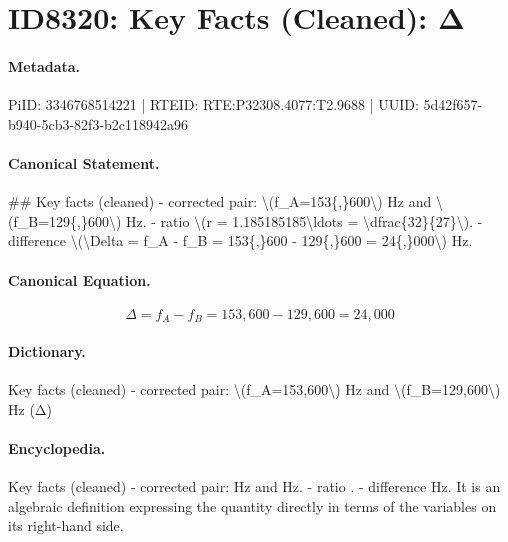 \section*{ID8320: Key Facts (Cleaned): Δ}
\paragraph{Metadata.}
PiID: 3346768514221 | RTEID: RTE:P32308.4077:T2.9688 | UUID: 5d42f657-b940-5cb3-82f3-b2c118942a96

\paragraph{Canonical Statement.}
\#\# Key facts (cleaned) - corrected pair: \textbackslash{}(f\_A=153\{,\}600\textbackslash{}) Hz and \textbackslash{}(f\_B=129\{,\}600\textbackslash{}) Hz. - ratio \textbackslash{}(r = 1.185185185\textbackslash{}ldots = \textbackslash{}dfrac\{32\}\{27\}\textbackslash{}). - difference \textbackslash{}(\textbackslash{}Delta = f\_A - f\_B = 153\{,\}600 - 129\{,\}600 = 24\{,\}000\textbackslash{}) Hz.

\paragraph{Canonical Equation.}
\[
\Delta = f_A - f_B = 153{,}600 - 129{,}600 = 24{,}000
\]

\paragraph{Dictionary.}
Key facts (cleaned) - corrected pair: \textbackslash{}(f\_A=153,600\textbackslash{}) Hz and \textbackslash{}(f\_B=129,600\textbackslash{}) Hz (Δ)

\paragraph{Encyclopedia.}
Key facts (cleaned) - corrected pair: Hz and Hz. - ratio . - difference Hz. It is an algebraic definition expressing the quantity directly in terms of the variables on its right-hand side.
